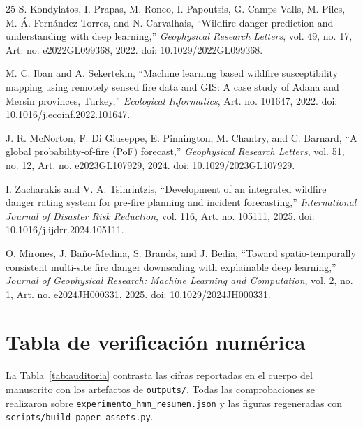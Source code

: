 \documentclass[11pt,letterpaper]{article}
\begin{document}
\begin{thebibliography}{25}
S. Kondylatos, I. Prapas, M. Ronco, I. Papoutsis, G. Camps-Valls, M. Piles, M.-\'A. Fern\'andez-Torres, and N. Carvalhais, ``Wildfire danger prediction and understanding with deep learning,'' \emph{Geophysical Research Letters}, vol. 49, no. 17, Art. no. e2022GL099368, 2022. doi: 10.1029/2022GL099368.

M. C. Iban and A. Sekertekin, ``Machine learning based wildfire susceptibility mapping using remotely sensed fire data and GIS: A case study of Adana and Mersin provinces, Turkey,'' \emph{Ecological Informatics}, Art. no. 101647, 2022. doi: 10.1016/j.ecoinf.2022.101647.

J. R. McNorton, F. Di Giuseppe, E. Pinnington, M. Chantry, and C. Barnard, ``A global probability-of-fire (PoF) forecast,'' \emph{Geophysical Research Letters}, vol. 51, no. 12, Art. no. e2023GL107929, 2024. doi: 10.1029/2023GL107929.

I. Zacharakis and V. A. Tsihrintzis, ``Development of an integrated wildfire danger rating system for pre-fire planning and incident forecasting,'' \emph{International Journal of Disaster Risk Reduction}, vol. 116, Art. no. 105111, 2025. doi: 10.1016/j.ijdrr.2024.105111.

O. Mirones, J. Ba\~no-Medina, S. Brands, and J. Bedia, ``Toward spatio-temporally consistent multi-site fire danger downscaling with explainable deep learning,'' \emph{Journal of Geophysical Research: Machine Learning and Computation}, vol. 2, no. 1, Art. no. e2024JH000331, 2025. doi: 10.1029/2024JH000331.

\end{thebibliography}

\appendix
\section{Tabla de verificación numérica}

La Tabla~\ref{tab:auditoria} contrasta las cifras reportadas en el cuerpo del manuscrito con los artefactos de \texttt{outputs/}. Todas las comprobaciones se realizaron sobre \texttt{experimento\_hmm\_resumen.json} y las figuras regeneradas con \texttt{scripts/build\_paper\_assets.py}.
\end{document}
